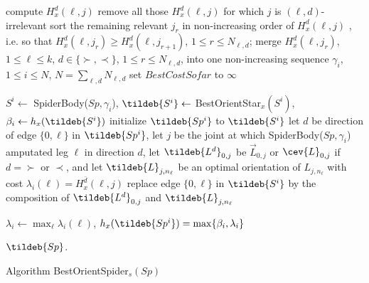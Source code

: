 \begin{algorithm}[!ht]
	\newcommand{\forcond}{$\ell=1$ \KwTo $k$}
		{  
		  {
		            {
		            compute $H^{d}_x(\ell,j)$ %
	                 }
		  remove all those $H^{d}_x(\ell,j)$ for which $j$ is $(\ell,d)$-irrelevant \;
		  sort the remaining relevant $j_r$ in non-increasing order of  $H^{d}_x(\ell,j)$ , i.e. so that 
		  $H^{d}_x(\ell,j_r) \geq H^{d}_x(\ell,j_{r+1})$, $1\leq r \leq N_{\ell,d}$;		
		}
      }
	merge  $H^{d}_x(\ell,j_r)$, $1\leq \ell \leq k$, $d \in \{\succ,\prec\}$,
	$1\leq r \leq N_{\ell,d}$,  into one non-increasing sequence
	$\gamma_i$, $1\leq i \leq N$, $N=\sum_{\ell,d}N_{\ell,d}$\;
	set $BestCostSofar$ to $\infty$\;
	{  
$S^i \leftarrow$ SpiderBody($Sp,\gamma_i$), 
$\tildeb{S^i}\leftarrow$ BestOrientStar$_x(S^i)$,
$\beta_i \leftarrow h_x(\tildeb{S^i})$\;
	initialize $\tildeb{Sp^i}$ to $\tildeb{S^i}$\;
	\For{\forcond}
	{let $d$ be direction of edge $\{0,\ell\}$ in $\tildeb{Sp^i}$, let 
	$j$ be the joint at which SpiderBody($Sp,\gamma_i$) amputated leg $\ell$ in direction $d$,
	let $\tildeb{L^d}_{0,j}$ be $\vec{L}_{0,j}$ or $\cev{L}_{0,j}$ if $d=\succ$ or $\prec$,
	and let $\tildeb{L}_{j,n_\ell}$ be an optimal orientation of $L_{j,n_\ell}$ 
	with cost $\lambda_i(\ell)=H^{\bar{d}}_x (\ell,j)$\;
	replace edge $\{0,\ell\}$ in $\tildeb{S^i}$ by the composition of 
	$\tildeb{L^d}_{0,j}$ and $\tildeb{L}_{j,n_\ell}$
	\;
	}

$\lambda_i \leftarrow \max_\ell \lambda_i(\ell)$, $h_x(\tildeb{Sp^i})=\max \{\beta_i,\lambda_i\}$\;

}
\Return $\tildeb{Sp}$.
	\caption{Algorithm BestOrientSpider$_s (Sp)$}
	\label{a.spiders}
\end{algorithm}

